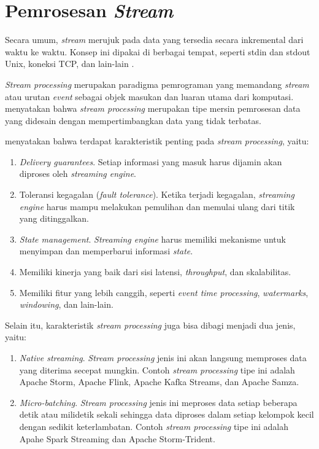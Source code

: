 \section{Pemrosesan \textit{Stream}}

Secara umum, \textit{stream} merujuk pada data yang tersedia secara inkremental dari waktu ke waktu. Konsep ini dipakai di berbagai tempat, seperti stdin dan stdout Unix, koneksi TCP, dan lain-lain \parencite{dataIntensiveApplications}.

\textit{Stream processing} merupakan paradigma pemrograman yang memandang \textit{stream} atau urutan \textit{event} sebagai objek masukan dan luaran utama dari komputasi. \cite{streaming101} menyatakan bahwa \textit{stream processing} merupakan tipe mersin pemrosesan data yang didesain dengan mempertimbangkan data yang tidak terbatas.

\cite{streamProcessingComparison} menyatakan bahwa terdapat karakteristik penting pada \textit{stream processing}, yaitu:

\begin{enumerate}
    \item \textit{Delivery guarantees}. Setiap informasi yang masuk harus dijamin akan diproses oleh \textit{streaming engine}.
    \item Toleransi kegagalan (\textit{fault tolerance}). Ketika terjadi kegagalan, \textit{streaming engine} harus mampu melakukan pemulihan dan memulai ulang dari titik yang ditinggalkan.
    \item \textit{State management}. \textit{Streaming engine} harus memiliki mekanisme untuk menyimpan dan memperbarui informasi \textit{state}.
    \item Memiliki kinerja yang baik dari sisi latensi, \textit{throughput}, dan skalabilitas.
    \item Memiliki fitur yang lebih canggih, seperti \textit{event time processing}, \textit{watermarks}, \textit{windowing}, dan lain-lain.
\end{enumerate}

Selain itu, karakteristik \textit{stream processing} juga bisa dibagi menjadi dua jenis, yaitu:

\begin{enumerate}
    \item \textit{Native streaming}. \textit{Stream processing} jenis ini akan langsung memproses data yang diterima secepat mungkin. Contoh \textit{stream processing} tipe ini adalah Apache Storm, Apache Flink, Apache Kafka Streams, dan Apache Samza.
    \item \textit{Micro-batching}. \textit{Stream processing} jenis ini meproses data setiap beberapa detik atau milidetik sekali sehingga data diproses dalam setiap kelompok kecil dengan sedikit keterlambatan. Contoh \textit{stream processing} tipe ini adalah Apahe Spark Streaming dan Apache Storm-Trident.
\end{enumerate}


